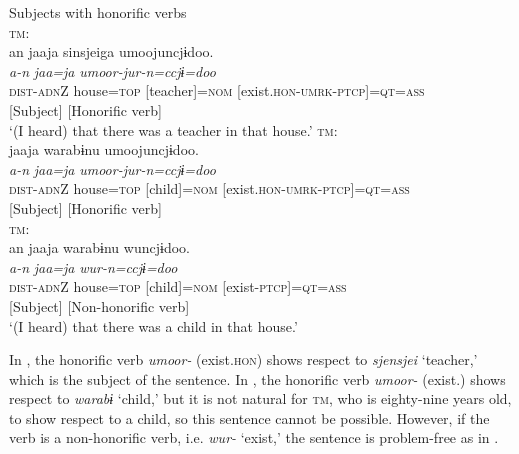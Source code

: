 {\smallex
\ea  Subjects with honorific verbs\\
\ea\label{ex:3.1a} \textsc{tm}:\hfill\relax[El: 120924] \\
\gllll          an                               {jaaja}                 {sinsjeiga}                {umoojuncjɨdoo.}\\
                {\itshape a-n}                  {\itshape jaa=ja}         {\itshape umoor-jur-n=ccjɨ=doo}\\
                {\textsc{dist}-\textsc{adn}Z}  {house=\textsc{top}}  {[teacher]=\textsc{nom}}    {[exist.\textsc{hon}-\textsc{umrk}-\textsc{ptcp}]=\textsc{qt}=\textsc{ass}}\\
                     {[Subject]} {} {} {[Honorific verb]}\\
\glt ‘(I heard) that there was a teacher in that house.’ 
\ex\label{ex:3.1b} \textsc{tm}: \hfill\relax [El: 120924]\\
  {jaaja}  {warabɨnu}  {umoojuncjɨdoo.}\\
               {\itshape a-n}  {\itshape jaa=ja}    {\itshape umoor-jur-n=ccjɨ=doo}\\
                {\textsc{dist}-\textsc{adn}Z}  {house=\textsc{top}}  {[child]=\textsc{nom}}  {[exist.\textsc{hon}-\textsc{umrk}-\textsc{ptcp}]=\textsc{qt}=\textsc{ass}}\\
                {[Subject]} {}  {}  {[Honorific verb]}\\

\ex\label{ex:3.1c} \textsc{tm}:\hfill\relax[El: 120924]\\
\gllll  an  {jaaja}  {warabɨnu}  {wuncjɨdoo.}\\
            {\itshape a-n}  {\itshape jaa=ja}    {\itshape wur-n=ccjɨ=doo}\\
            {\textsc{dist}-\textsc{adn}Z}  {house=\textsc{top}}  {[child]=\textsc{nom}}  {[exist-\textsc{ptcp}]=\textsc{qt}=\textsc{ass}}\\
             {[Subject]} {}   {}  {[Non-honorific verb]}\\
   \glt  ‘(I heard) that there was a child in that house.’ 
\z
\z}

In , the honorific verb \textit{umoor-} (exist.\textsc{hon}) shows respect to \textit{sjensjei} ‘teacher,’ which is the subject of the sentence. In , the honorific verb \textit{umoor-} (exist.\HON) shows respect to \textit{warabɨ} ‘child,’ but it is not natural for \textsc{tm}, who is eighty-nine years old, to show respect to a child, so this sentence cannot be possible. However, if the verb is a non-honorific verb, i.e. \textit{wur-} ‘exist,’ the sentence is problem-free as in .

